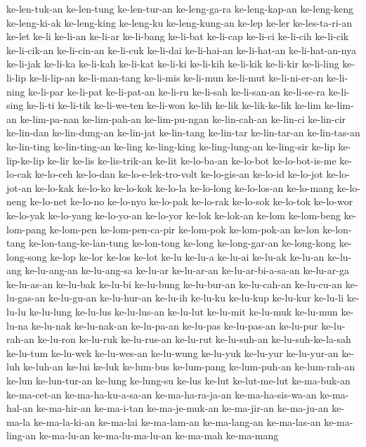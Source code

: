 {ke-len-tuk-an ke-len-tung ke-len-tur-an ke-leng-ga-ra ke-leng-kap-an
ke-leng-keng ke-leng-ki-ak ke-leng-king ke-leng-ku ke-leng-kung-an ke-lep
ke-ler ke-les-ta-ri-an ke-let ke-li ke-li-an ke-li-ar ke-li-bang ke-li-bat
ke-li-cap ke-li-ci ke-li-cih ke-li-cik ke-li-cik-an ke-li-cin-an ke-li-cuk
ke-li-dai ke-li-hai-an ke-li-hat-an ke-li-hat-an-nya ke-li-jak ke-li-ka
ke-li-kah ke-li-kat ke-li-ki ke-li-kih ke-li-kik ke-li-kir ke-li-ling
ke-li-lip ke-li-lip-an ke-li-man-tang ke-li-mis ke-li-mun ke-li-mut
ke-li-ni-er-an ke-li-ning ke-li-par ke-li-pat ke-li-pat-an ke-li-ru
ke-li-sah ke-li-san-an ke-li-se-ra ke-li-sing ke-li-ti ke-li-tik
ke-li-we-ten ke-li-won ke-lih ke-lik ke-lik-ke-lik ke-lim ke-lim-an
ke-lim-pa-nan ke-lim-pah-an ke-lim-pu-ngan ke-lin-cah-an ke-lin-ci
ke-lin-cir ke-lin-dan ke-lin-dung-an ke-lin-jat ke-lin-tang ke-lin-tar
ke-lin-tar-an ke-lin-tas-an ke-lin-ting ke-lin-ting-an ke-ling
ke-ling-king ke-ling-lung-an ke-ling-sir ke-lip ke-lip-ke-lip ke-lir
ke-lis ke-lis-trik-an ke-lit ke-lo-ba-an ke-lo-bot ke-lo-bot-is-me
ke-lo-cak ke-lo-ceh ke-lo-dan ke-lo-e-lek-tro-volt ke-lo-gis-an ke-lo-id
ke-lo-jot ke-lo-jot-an ke-lo-kak ke-lo-ko ke-lo-kok ke-lo-la ke-lo-long
ke-lo-los-an ke-lo-mang ke-lo-neng ke-lo-net ke-lo-no ke-lo-nyo ke-lo-pak
ke-lo-rak ke-lo-sok ke-lo-tok ke-lo-wor ke-lo-yak ke-lo-yang ke-lo-yo-an
ke-lo-yor ke-lok ke-lok-an ke-lom ke-lom-beng ke-lom-pang ke-lom-pen
ke-lom-pen-ca-pir ke-lom-pok ke-lom-pok-an ke-lon ke-lon-tang
ke-lon-tang-ke-lan-tung ke-lon-tong ke-long ke-long-gar-an ke-long-kong
ke-long-song ke-lop ke-lor ke-los ke-lot ke-lu ke-lu-a ke-lu-ai ke-lu-ak
ke-lu-an ke-lu-ang ke-lu-ang-an ke-lu-ang-sa ke-lu-ar ke-lu-ar-an
ke-lu-ar-bi-a-sa-an ke-lu-ar-ga ke-lu-as-an ke-lu-bak ke-lu-bi ke-lu-bung
ke-lu-bur-an ke-lu-cah-an ke-lu-cu-an ke-lu-gas-an ke-lu-gu-an
ke-lu-hur-an ke-lu-ih ke-lu-ku ke-lu-kup ke-lu-kur ke-lu-li ke-lu-lu
ke-lu-lung ke-lu-lus ke-lu-lus-an ke-lu-lut ke-lu-mit ke-lu-muk ke-lu-mun
ke-lu-na ke-lu-nak ke-lu-nak-an ke-lu-pa-an ke-lu-pas ke-lu-pas-an
ke-lu-pur ke-lu-rah-an ke-lu-ron ke-lu-ruk ke-lu-rus-an ke-lu-rut
ke-lu-suh-an ke-lu-suh-ke-la-sah ke-lu-tum ke-lu-wek ke-lu-wes-an
ke-lu-wung ke-lu-yuk ke-lu-yur ke-lu-yur-an ke-luh ke-luh-an ke-lui ke-luk
ke-lum-bus ke-lum-pang ke-lum-puh-an ke-lum-rah-an ke-lun ke-lun-tur-an
ke-lung ke-lung-su ke-lus ke-lut ke-lut-me-lut ke-ma-buk-an ke-ma-cet-an
ke-ma-ha-ku-a-sa-an ke-ma-ha-ra-ja-an ke-ma-ha-sis-wa-an ke-ma-hal-an
ke-ma-hir-an ke-ma-i-tan ke-ma-je-muk-an ke-ma-jir-an ke-ma-ju-an ke-ma-la
ke-ma-la-ki-an ke-ma-lai ke-ma-lam-an ke-ma-lang-an ke-ma-las-an
ke-ma-ling-an ke-ma-lu-an ke-ma-lu-ma-lu-an ke-ma-mah ke-ma-mang
}

